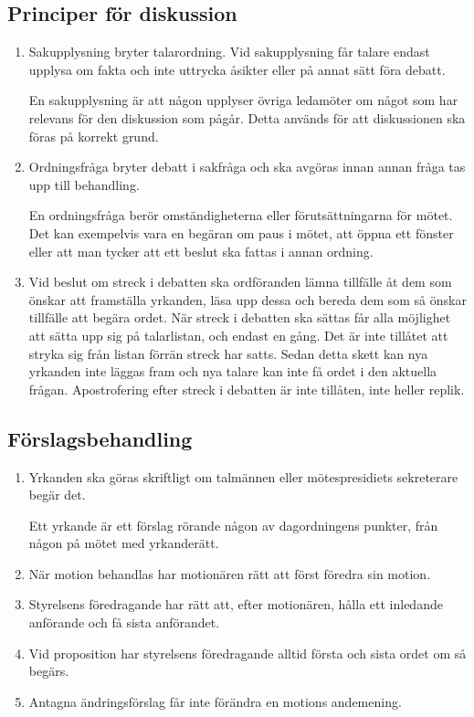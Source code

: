 \documentclass{dvd}
\begin{document}
	\subsection{Principer för diskussion}

	\begin{enumerate}[label=\arabic* §, ref=\arabic*]
		\item Sakupplysning bryter talarordning.
		Vid sakupplysning får talare endast upplysa om fakta och inte uttrycka åsikter eller på annat sätt föra debatt.

		En sakupplysning är att någon upplyser övriga ledamöter om något som har relevans för den diskussion som pågår.
		Detta används för att diskussionen ska föras på korrekt grund.

		\item Ordningsfråga bryter debatt i sakfråga och ska avgöras innan annan fråga tas upp till behandling.

		En ordningsfråga berör omständigheterna eller förutsättningarna för mötet.
		Det kan exempelvis vara en begäran om paus i mötet, att öppna ett fönster eller att man tycker att ett beslut ska fattas i annan ordning.

		\item  Vid beslut om streck i debatten ska ordföranden lämna tillfälle åt dem som önskar att framställa yrkanden, läsa upp dessa och bereda dem som så önskar tillfälle att begära ordet.
		När streck i debatten ska sättas får alla möjlighet att sätta upp sig på talarlistan, och endast en gång.
		Det är inte tillåtet att stryka sig från listan förrän streck har satts.
		Sedan detta skett kan nya yrkanden inte läggas fram och nya talare kan inte få ordet i den aktuella frågan.
		Apostrofering efter streck i debatten är inte tillåten, inte heller replik.
	\end{enumerate}

	\subsection{Förslagsbehandling}

	\begin{enumerate}[label=\arabic* §, ref=\arabic*]
		\item Yrkanden ska göras skriftligt om talmännen eller mötespresidiets sekreterare begär det.

		Ett yrkande är ett förslag rörande någon av dagordningens punkter, från någon på mötet med yrkanderätt.

		\item När motion behandlas har motionären rätt att först föredra sin motion.

		\item Styrelsens föredragande har rätt att, efter motionären, hålla ett inledande anförande och få sista anförandet.

		\item Vid proposition har styrelsens föredragande alltid första och sista ordet om så begärs.

		\item Antagna ändringsförslag får inte förändra en motions andemening.
	\end{enumerate}
\end{document}
